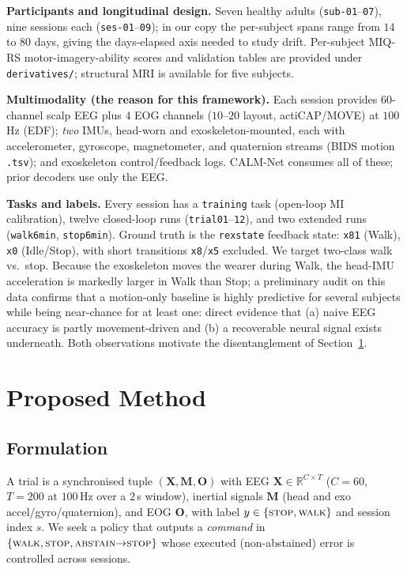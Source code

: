 \documentclass[conference]{IEEEtran}
\begin{document}
\textbf{Participants and longitudinal design.} Seven healthy adults
(\texttt{sub-01}--\texttt{07}), nine sessions each (\texttt{ses-01}--\texttt{09}); in
our copy the per-subject spans range from $14$ to $80$ days, giving the days-elapsed
axis needed to study drift. Per-subject MIQ-RS motor-imagery-ability scores and
validation tables are provided under \texttt{derivatives/}; structural MRI is
available for five subjects.

\textbf{Multimodality (the reason for this framework).} Each session provides
$60$-channel scalp EEG plus $4$ EOG channels ($10$--$20$ layout, actiCAP/MOVE) at
$100$\,Hz (EDF); \emph{two} IMUs, head-worn and exoskeleton-mounted, each with
accelerometer, gyroscope, magnetometer, and quaternion streams (BIDS motion
\texttt{.tsv}); and exoskeleton control/feedback logs. CALM-Net consumes all of
these; prior decoders use only the EEG.

\textbf{Tasks and labels.} Every session has a \texttt{training} task (open-loop MI
calibration), twelve closed-loop runs (\texttt{trial01}--\texttt{12}), and two
extended runs (\texttt{walk6min}, \texttt{stop6min}). Ground truth is the
\texttt{rexstate} feedback state: \texttt{x81} (Walk), \texttt{x0} (Idle/Stop), with
short transitions \texttt{x8}/\texttt{x5} excluded. We target two-class walk vs.\
stop. Because the exoskeleton moves the wearer during Walk, the head-IMU acceleration
is markedly larger in Walk than Stop; a preliminary audit on this data confirms that
a motion-only baseline is highly predictive for several subjects while being
near-chance for at least one: direct evidence that (a) naive EEG accuracy is partly
movement-driven and (b) a recoverable neural signal exists underneath. Both
observations motivate the disentanglement of Section~\ref{sec:method}.

\section{Proposed Method}\label{sec:method}
\subsection{Formulation}
A trial is a synchronised tuple $(\mathbf{X},\mathbf{M},\mathbf{O})$ with EEG
$\mathbf{X}\in\mathbb{R}^{C\times T}$ ($C{=}60$, $T{=}200$ at $100$\,Hz over a $2$\,s
window), inertial signals $\mathbf{M}$ (head and exo accel/gyro/quaternion), and EOG
$\mathbf{O}$, with label $y\in\{\textsc{stop},\textsc{walk}\}$ and session index
$s$. We seek a policy that outputs a \emph{command} in
$\{\textsc{walk},\textsc{stop},\textsc{abstain}{\to}\textsc{stop}\}$ whose executed
(non-abstained) error is controlled across sessions.
\end{document}

